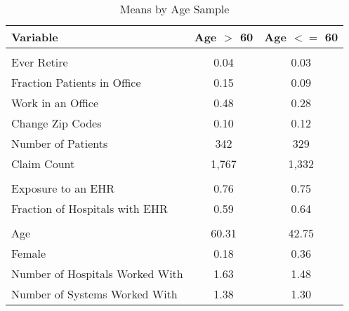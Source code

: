 \begin{table}[ht]

\caption{Means by Age Sample}
\centering
\begin{tabular}[t]{lcc}
\toprule
Variable & Age $>$ 60 & Age $<=$ 60\\
\midrule
\addlinespace[0.3em]
\multicolumn{3}{l}{\textbf{Outcomes}}\\
\hspace{1em}Ever Retire & 0.04 & 0.03\\
\hspace{1em}Fraction Patients in Office & 0.15 & 0.09\\
\hspace{1em}Work in an Office & 0.48 & 0.28\\
\hspace{1em}Change Zip Codes & 0.10 & 0.12\\
\hspace{1em}Number of Patients & 342 & 329\\
\hspace{1em}Claim Count & 1,767 & 1,332\\
\addlinespace[0.3em]
\multicolumn{3}{l}{\textbf{Treatment}}\\
\hspace{1em}Exposure to an EHR & 0.76 & 0.75\\
\hspace{1em}Fraction of Hospitals with EHR & 0.59 & 0.64\\
\addlinespace[0.3em]
\multicolumn{3}{l}{\textbf{Characteristics}}\\
\hspace{1em}Age & 60.31 & 42.75\\
\hspace{1em}Female & 0.18 & 0.36\\
\hspace{1em}Number of Hospitals Worked With & 1.63 & 1.48\\
\hspace{1em}Number of Systems Worked With & 1.38 & 1.30\\
\bottomrule
\end{tabular}
\end{table}
\label{tab:splitstats}